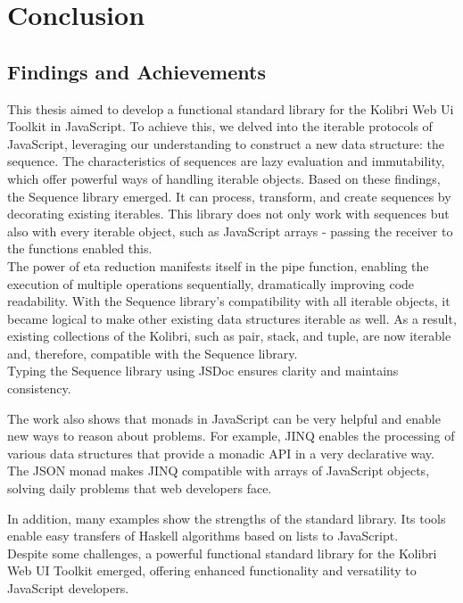 \section{Conclusion}
\label{sec:conclusion}
\subsection{Findings and Achievements}
\label{sub:Findings and Achievements}
This thesis aimed to develop a functional standard library for the Kolibri Web
Ui Toolkit in JavaScript. To achieve this, we delved into the iterable
protocols of JavaScript, leveraging our understanding to construct a new data
structure: the sequence. The characteristics of sequences are lazy evaluation
and immutability, which offer powerful ways of handling iterable objects. Based
on these findings, the Sequence library emerged. It can process, transform, and
create sequences by decorating existing iterables. This library does not only
work with sequences but also with every iterable object, such as JavaScript
arrays - passing the receiver to the functions enabled this.\\
The power of eta reduction manifests itself in the pipe function, enabling the
execution of multiple operations sequentially, dramatically improving code
readability. With the Sequence library’s compatibility with all iterable
objects, it became logical to make other existing data structures iterable as
well. As a result, existing collections of the Kolibri, such as pair, stack,
and tuple, are now iterable and, therefore, compatible with the Sequence
library.\\
Typing the Sequence library using JSDoc ensures clarity and maintains
consistency.

The work also shows that monads in JavaScript can be very helpful and enable
new ways to reason about problems. For example, JINQ enables the processing of
various data structures that provide a monadic API in a very declarative way.
The JSON monad makes JINQ compatible with arrays of JavaScript objects, solving
daily problems that web developers face.

In addition, many examples show the strengths of the standard library. Its
tools enable easy transfers of Haskell algorithms based on lists
to JavaScript.\\
Despite some challenges, a powerful functional standard library for the Kolibri
Web UI Toolkit emerged, offering enhanced functionality and versatility to
JavaScript developers.\\
